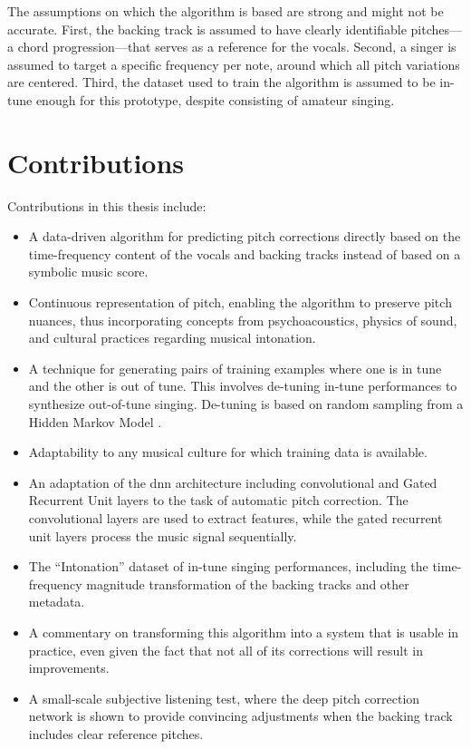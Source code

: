 The assumptions on which the algorithm is based are strong and might not be accurate. First, the backing track is assumed to have clearly identifiable pitches---a chord progression---that serves as a reference for the vocals. Second, a singer is assumed to target a specific frequency per note, around which all pitch variations are centered. Third, the dataset used to train the algorithm is assumed to be in-tune enough for this prototype, despite consisting of amateur singing. %


\section{Contributions}
Contributions in this thesis include:
\begin{itemize}
    \item A data-driven algorithm for predicting pitch corrections directly based on the time-frequency content of the vocals and backing tracks instead of based on a symbolic music score.
    \item Continuous representation of pitch, enabling the algorithm to preserve pitch nuances, thus incorporating concepts from psychoacoustics, physics of sound, and cultural practices regarding musical intonation.
    \item A technique for generating pairs of training examples where one is in tune and the other is out of tune. This involves de-tuning in-tune performances to synthesize out-of-tune singing. De-tuning is based on random sampling from a Hidden Markov Model \cite{rabiner1989tutorial}.
    \item Adaptability to any musical culture for which training data is available.
    \item An adaptation of the \gls{dnn} architecture including convolutional and Gated Recurrent Unit \cite{chung2014empirical} layers to the task of automatic pitch correction. The convolutional layers are used to extract features, while the gated recurrent unit layers process the music signal sequentially.
    \item The ``Intonation'' dataset of in-tune singing performances, including the time-frequency magnitude transformation of the backing tracks and other metadata.
    \item A commentary on transforming this algorithm into a system that is usable in practice, even given the fact that not all of its corrections will result in improvements.
    \item A small-scale subjective listening test, where the deep pitch correction network is shown to provide convincing adjustments when the backing track includes clear reference pitches.
\end{itemize}

